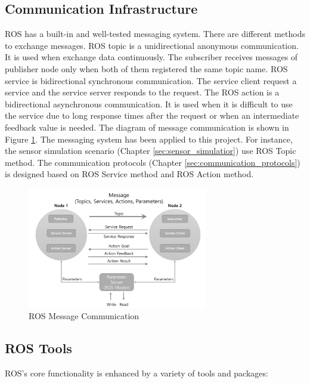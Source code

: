 \subsection{Communication Infrastructure}
ROS has a built-in and well-tested messaging system. There are different methods to exchange messages.  ROS topic is a unidirectional anonymous communication. It is used when exchange data continuously. The subscriber receives messages of publisher node only when both of them registered the same topic name. ROS service is bidirectional synchronous communication. The service client request a service and the service server responds to the request. The ROS action is a bidirectional asynchronous communication. It is used when it is difficult to use the service due to long response times after the request or when an intermediate feedback value is needed.
The diagram of message communication is shown in Figure \ref{fig:ros_message_communication}. The messaging system has been applied to this project. For instance, the sensor simulation scenario (Chapter \ref{sec:sensor_simulatior}) use ROS Topic method. The communication protocols (Chapter \ref{sec:communication_protocols}) is designed based on ROS Service method and ROS Action method.   

\begin{figure}
    \centering
    \includegraphics[width = 0.7\textwidth]{content/images/ch2/ros_message_communication.png}
    \caption{ROS Message Communication \cite{Pyo17}}
    \label{fig:ros_message_communication}
    \end{figure}
    
\subsection{ROS Tools}
ROS's core functionality is enhanced by a variety of tools and packages:

